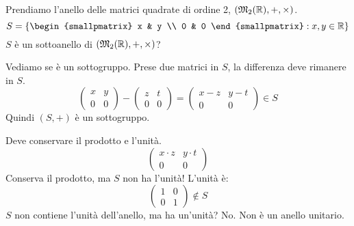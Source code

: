 \begin{exmp}
Prendiamo l'anello delle matrici quadrate di ordine 2, $(\mathfrak{M}_2 (\mathbb{R}), +, \times)$.
\[
S = \left\{ 
\begin{smallpmatrix}
x & y \\
0 & 0
\end{smallpmatrix}
 : x, y \in \reals \right\}
\]
$S$ \`e un sottoanello di $(\mathfrak{M}_2 (\mathbb{R}), +, \times)$?

Vediamo se \`e un sottogruppo. Prese due matrici in $S$, la differenza deve rimanere in $S$.
\[
\begin{pmatrix}
x & y \\
0 & 0
\end{pmatrix}
-
\begin{pmatrix}
z & t \\
0 & 0
\end{pmatrix}
=
\begin{pmatrix}
x - z & y - t \\
0 & 0
\end{pmatrix}
\in S
\]
Quindi $(S,+)$ \`e un sottogruppo.

Deve conservare il prodotto e l'unit\`a.
\[
\begin{pmatrix}
x \cdot z & y \cdot t \\
0 & 0
\end{pmatrix}
\]
Conserva il prodotto, ma $S$ non ha l'unit\`a! L'unit\`a \`e:
\[
\begin{pmatrix}
1 & 0 \\
0 & 1
\end{pmatrix}
\notin S
\]
$S$ non contiene l'unit\`a dell'anello, ma ha un'unit\`a? No. Non \`e un anello unitario.


\end{exmp}
